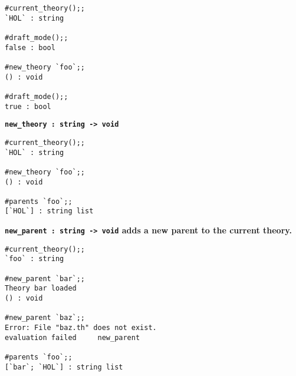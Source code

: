 \begin{session}\begin{verbatim}
#current_theory();;
`HOL` : string

#draft_mode();;
false : bool

#new_theory `foo`;;
() : void

#draft_mode();;
true : bool
\end{verbatim}\end{session}



\vskip5mm
\bspindent\LARGE\bf
     \verb!new_theory : string -> void!
\espindent
\vskip5mm



\vskip4mm
\vskip5mm


\begin{session}\begin{verbatim}
#current_theory();;
`HOL` : string

#new_theory `foo`;;
() : void

#parents `foo`;;
[`HOL`] : string list
\end{verbatim}\end{session}



\vskip5mm
\bspindent\LARGE\bf
\verb!new_parent : string -> void!
\espindent
\vskip5mm
\bpindent\LARGE\bf
adds a new parent to the current theory. 
\epindent

\vskip7mm

\begin{session}\begin{verbatim}
#current_theory();;
`foo` : string

#new_parent `bar`;;
Theory bar loaded
() : void

#new_parent `baz`;;
Error: File "baz.th" does not exist.
evaluation failed     new_parent

#parents `foo`;;
[`bar`; `HOL`] : string list
\end{verbatim}\end{session}



